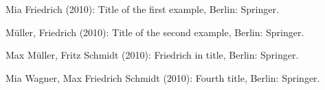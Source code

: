 Mia Friedrich (2010): Title of the first example, Berlin: Springer.

M\"{u}ller, Friedrich (2010): Title of the second example, Berlin: Springer.

Max M\"{u}ller, Fritz Schmidt (2010): Friedrich in title, Berlin: Springer.

Mia Wagner, Max Friedrich Schmidt (2010): Fourth title, Berlin: Springer.
